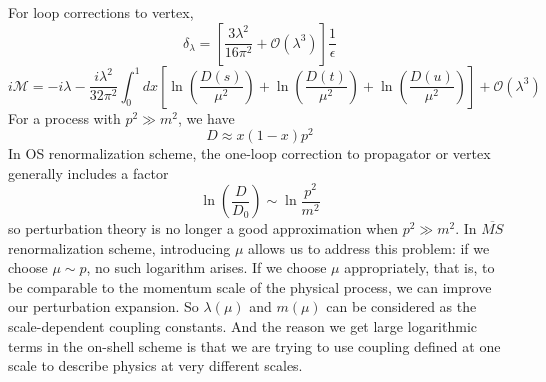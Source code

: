 \documentclass[cyan]{elegantnote}
\begin{document}
For loop corrections to vertex,
\[\delta_{\lambda} = \left[\frac{3\lambda^2}{16\pi^2} + \mathcal{O}(\lambda^3)\right]\frac{1}{\epsilon}\]
\[i\mathcal{M} = -i\lambda -\frac{i\lambda^2}{32\pi^2} \int_0^1 dx \left[\ln(\frac{D(s)}{\mu^2}) +\ln(\frac{D(t)}{\mu^2})+\ln(\frac{D(u)}{\mu^2})\right] + \mathcal{O}(\lambda^3)\]
For a process with $p^2 \gg m^2$, we have
\[ D \approx x(1-x)p^2\]
In OS renormalization scheme, the one-loop correction to propagator or vertex generally includes a factor
\[\ln \left( \frac{D}{D_0}\right ) \sim \ln \frac{p^2}{m^2}\]
so perturbation theory is no longer a good approximation when $p^2 \gg m^2$.
In $\overline{MS}$ renormalization scheme, introducing $\mu$ allows us to address this problem: if we choose $\mu \sim p$, no such logarithm arises. If we choose $\mu$ appropriately, that is, to be comparable to the momentum scale of the physical process, we can
improve our perturbation expansion. 
So $\lambda(\mu)$ and $m(\mu)$ can be considered as the scale-dependent coupling constants.
And the reason we get large logarithmic terms in the on-shell scheme is that we are trying to use coupling defined at one scale to describe physics at very different scales.
\end{document}
